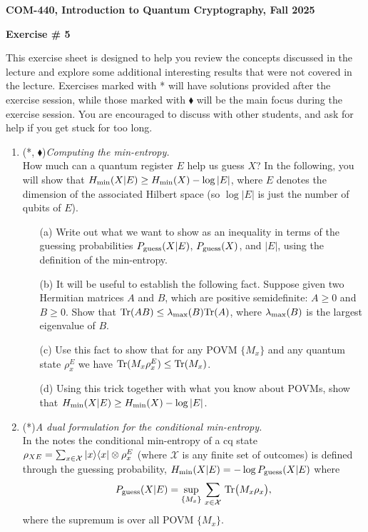 \documentclass[12pt]{article}
\newcommand{\pguess}{P_{\rm guess}}
\newcommand{\header}[1]{\begin{center} {\large\bf #1} \end{center}}
\begin{document}
\header{COM-440, Introduction to Quantum Cryptography, Fall 2025}
\header{\bf Exercise \# 5}

This exercise sheet is designed to help you review the concepts discussed in the lecture and explore some additional interesting results that were not covered in the lecture. Exercises marked with * will have solutions provided after the exercise session, while those marked with $\blacklozenge$ will be the main focus during the exercise session. You are encouraged to discuss with other students, and ask for help if you get stuck for too long.

\begin{enumerate}

\item {(*, $\blacklozenge$)\em Computing the min-entropy.}\\
How much can a quantum register $E$ help us guess $X$? In the following, you will show that $H_{\rm min}(X|E) \geq H_{\rm min}(X) - \log |E|$, where $E$ denotes the dimension of the associated Hilbert space (so $\log |E|$ is just the number of qubits of $E$).
\begin{enumerate}
\item[(a)] Write out what we want to show as an inequality in terms of the guessing probabilities $\pguess(X \vert E)$, $\pguess(X)$, and $|E|$, using the definition of the min-entropy.
\item[(b)] It will be useful to establish the following fact. Suppose given two Hermitian matrices $A$ and $B$, which are positive semidefinite: $A \geq 0$ and $B \geq 0$. Show that $\mathrm{Tr}(AB) \leq \lambda_{\rm max}(B) \mathrm{Tr}(A)$, where $\lambda_{\rm max}(B)$ is the largest eigenvalue of $B$.
\item[(c)] Use this fact to show that for any POVM $\{M_x\}$ and any quantum state $\rho^E_x$ we have $\mathrm{Tr}(M_x \rho^E_x) \leq \mathrm{Tr}(M_x)$. 
\item[(d)] Using this trick together with what you know about POVMs, show that $H_{\rm min}(X|E) \geq H_{\rm min}(X) - \log |E|$. 
\end{enumerate}


\item {(*)\em A dual formulation for the conditional min-entropy.}\\
In the notes the conditional min-entropy of a cq state $\rho_{XE}  = \sum_{x\in\mathcal{X}} \ket{x}\!\bra{x}\otimes \rho_x^E$ (where $\mathcal{X}$ is any finite set of outcomes) is defined through the guessing probability, $\hmin(X|E) = -\log \pguess(X|E)$ where 
\begin{equation}\label{eq:pguess}
 \pguess(X|E) = \sup_{\{M_x\}}\,\sum_{x\in\mathcal{X}} \,\Tr\big(M_x\rho_x\big), 
\end{equation}
where the supremum is over all POVM $\{M_x\}$.


\end{enumerate}
\end{document}
